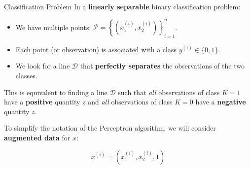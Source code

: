 \begin{frame}{Classification Problem}
	In a \textbf{linearly separable} binary classification problem:
	
	\begin{itemize}
		\item We have multiple points: $\mathcal{P} = \left\{ \left( x_1^{(i)}, x_2^{(i)}\right) \right\}_{i=1}^n$.
		\item Each point (or observation) is associated with a class $y^{(i)} \in \{0, 1\}$.
		\item We look for a line $\mathcal{D}$ that \textbf{perfectly separates} the observations of the two classes.
	\end{itemize}
	
	\vspace{0.3cm}
	\pause
	
	This is equivalent to finding a line $\mathcal{D}$ such that \textit{all} observations of class $K = 1$ have a \textbf{positive} quantity $z$ and \textit{all} observations of class $K = 0$ have a \textbf{negative} quantity $z$.
	
	\vspace{0.3cm}
	\pause
	
	To simplify the notation of the Perceptron algorithm, we will consider \textbf{augmented data} for $x$:
	
	\begin{equation*}
		x^{(i)} = \left( x_1^{(i)}, x_2^{(i)}, 1\right)
	\end{equation*}
\end{frame}


